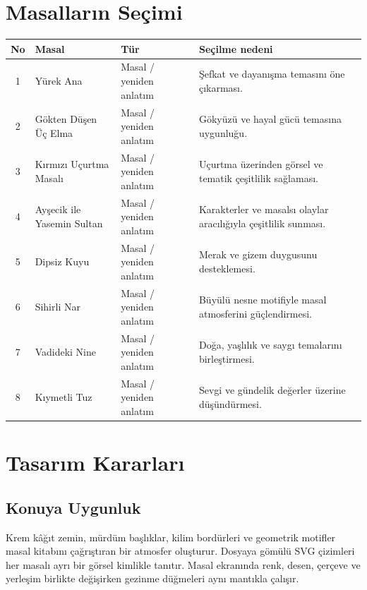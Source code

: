 \documentclass[12pt,a4paper]{article}
\begin{document}
\section{Masalların Seçimi}
\begin{longtable}{@{}cp{3.6cm}p{2.8cm}p{5.8cm}@{}}
\toprule
\textbf{No} & \textbf{Masal} & \textbf{Tür} & \textbf{Seçilme nedeni}\\
\midrule
\endhead
1 & Yürek Ana & Masal / yeniden anlatım & Şefkat ve dayanışma temasını öne çıkarması.\\
2 & Gökten Düşen Üç Elma & Masal / yeniden anlatım & Gökyüzü ve hayal gücü temasına uygunluğu.\\
3 & Kırmızı Uçurtma Masalı & Masal / yeniden anlatım & Uçurtma üzerinden görsel ve tematik çeşitlilik sağlaması.\\
4 & Ayşecik ile Yasemin Sultan & Masal / yeniden anlatım & Karakterler ve masalsı olaylar aracılığıyla çeşitlilik sunması.\\
5 & Dipsiz Kuyu & Masal / yeniden anlatım & Merak ve gizem duygusunu desteklemesi.\\
6 & Sihirli Nar & Masal / yeniden anlatım & Büyülü nesne motifiyle masal atmosferini güçlendirmesi.\\
7 & Vadideki Nine & Masal / yeniden anlatım & Doğa, yaşlılık ve saygı temalarını birleştirmesi.\\
8 & Kıymetli Tuz & Masal / yeniden anlatım & Sevgi ve gündelik değerler üzerine düşündürmesi.\\
\bottomrule
\end{longtable}

\section{Tasarım Kararları}
\subsection{Konuya Uygunluk}
Krem kâğıt zemin, mürdüm başlıklar, kilim bordürleri ve geometrik motifler masal kitabını çağrıştıran bir atmosfer oluşturur. Dosyaya gömülü SVG çizimleri her masalı ayrı bir görsel kimlikle tanıtır. Masal ekranında renk, desen, çerçeve ve yerleşim birlikte değişirken gezinme düğmeleri aynı mantıkla çalışır.
\end{document}
